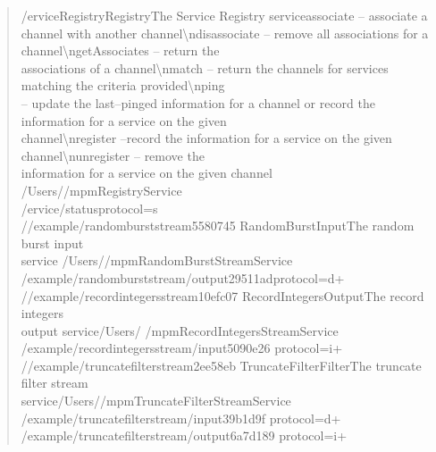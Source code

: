 \begin{quote}
/\textdollar{}ervice\pseudotab{}Registry\pseudotab{}Registry\pseudotab{}The Service
Registry service\pseudotab{}associate -- associate a channel with another
channel\textbackslash{}ndisassociate -- remove all associations for a
channel\textbackslash{}ngetAssociates -- return the\\
associations of a channel\textbackslash{}nmatch -- return the channels for services
matching the criteria provided\textbackslash{}nping\\
-- update the last--pinged information for a channel or record the information for a
service on the given\\
channel\textbackslash{}nregister --record the information for a service on the given
channel\textbackslash{}nunregister -- remove the\\
information for a service on the given channel\pseudotab{}%
/Users/\textellipsis{}/mpmRegistryService\pseudotab{}%
\pseudotab{}\\
/\textdollar{}ervice/status\textbraceleft{}protocol=s\textbraceright{}\\

/\serviceName/example/randomburststream\textunderscore{}5580745\pseudotab{}%
RandomBurst\pseudotab{}Input\pseudotab{}The random burst input\\
service\pseudotab{}\pseudotab{}%
/Users/\textellipsis{}/mpmRandomBurstStreamService\pseudotab{}\pseudotab{}\\
/example/randomburststream/output\textunderscore{}29511ad\textbraceleft{}protocol=d+%
\textbraceright{}\\

/\serviceName/example/recordintegersstream\textunderscore{}10efc07\pseudotab{}%
RecordIntegers\pseudotab{}Output\pseudotab{}The record integers\\
output service\pseudotab{}\pseudotab{}/Users/\textellipsis{}%
/mpmRecordIntegersStreamService\pseudotab{}\\
/example/recordintegersstream/input\textunderscore{}5090e26\textbraceleft{}%
protocol=i+\textbraceright{}\\

/\serviceName/example/truncatefilterstream\textunderscore{}2ee58eb\pseudotab{}%
TruncateFilter\pseudotab{}Filter\pseudotab{}The truncate filter stream\\
service\pseudotab{}\pseudotab{}/Users/\textellipsis{}/mpmTruncateFilterStreamService%
\pseudotab{}\\
/example/truncatefilterstream/input\textunderscore{}39b1d9f\textbraceleft{}%
protocol=d+\textbraceright{}\pseudotab{}\\
/example/truncatefilterstream/output\textunderscore{}6a7d189\textbraceleft{}%
protocol=i+\textbraceright{}
\end{quote}


